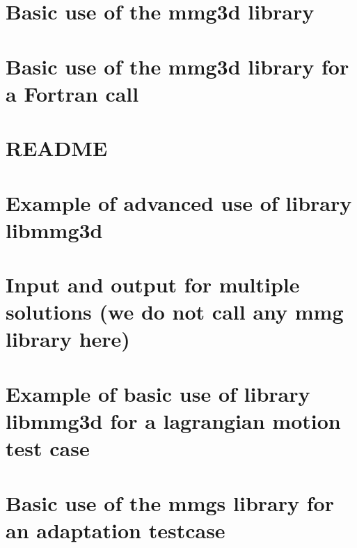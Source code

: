 \documentclass[twoside]{book}
\newcommand{\+}{\discretionary{\mbox{\scriptsize$\hookleftarrow$}}{}{}}
\begin{document}
\chapter{Basic use of the mmg3d library}
\label{md_libexamples_mmg3d_adaptation_example0_README}

\chapter{Basic use of the mmg3d library for a Fortran call}
\label{md_libexamples_mmg3d_adaptation_example0_fortran_README}

\chapter{README}
\label{md_libexamples_mmg3d_adaptation_example1_README}

\chapter{Example of advanced use of library libmmg3d}
\label{md_libexamples_mmg3d_adaptation_example2_README}

\chapter{Input and output for multiple solutions (we do not call any mmg library here)}
\label{md_libexamples_mmg3d_io_multisols_example6_README}

\chapter{Example of basic use of library libmmg3d for a lagrangian motion test case}
\label{md_libexamples_mmg3d_LagrangianMotion_example0_README}

\chapter{Basic use of the mmgs library for an adaptation testcase}
\label{md_libexamples_mmgs_adaptation_example0_README}

\end{document}
